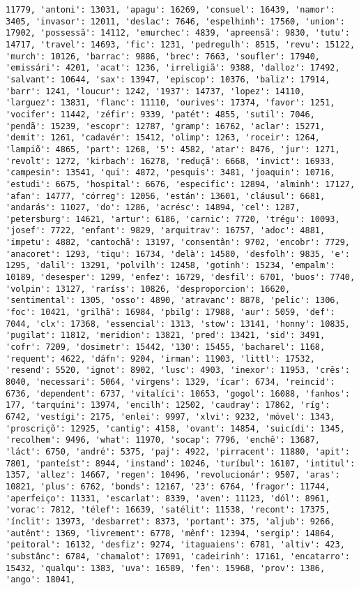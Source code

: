 \begin{Verbatim}[commandchars=\\\{\}]
11779, 'antoni': 13031, 'apagu': 16269, 'consuel': 16439, 'namor': 3405, 'invasor': 12011, 'deslac': 7646, 'espelhinh': 17560, 'union': 17902, 'possessã': 14112, 'emurchec': 4839, 'apreensã': 9830, 'tutu': 14717, 'travel': 14693, 'fic': 1231, 'pedregulh': 8515, 'revu': 15122, 'murch': 10126, 'barrac': 9886, 'brec': 7663, 'soufler': 17940, 'emissári': 4201, 'acat': 1236, 'irreligiã': 9388, 'dalloz': 17492, 'salvant': 10644, 'sax': 13947, 'episcop': 10376, 'baliz': 17914, 'barr': 1241, 'loucur': 1242, '1937': 14737, 'lopez': 14110, 'larguez': 13831, 'flanc': 11110, 'ourives': 17374, 'favor': 1251, 'vocifer': 11442, 'zéfir': 9339, 'patét': 4855, 'sutil': 7046, 'pendã': 15239, 'escopr': 12787, 'gramp': 16762, 'aclar': 15271, 'demit': 1261, 'cadavér': 15412, 'olimp': 1263, 'roceir': 1264, 'lampiõ': 4865, 'part': 1268, '5': 4582, 'atar': 8476, 'jur': 1271, 'revolt': 1272, 'kirbach': 16278, 'reduçã': 6668, 'invict': 16933, 'campesin': 13541, 'qui': 4872, 'pesquis': 3481, 'joaquin': 10716, 'estudi': 6675, 'hospital': 6676, 'especific': 12894, 'alminh': 17127, 'afan': 14777, 'córreg': 12056, 'están': 13601, 'cláusul': 6681, 'andarás': 11027, 'do': 1286, 'acrésc': 14894, 'cel': 1287, 'petersburg': 14621, 'artur': 6186, 'carnic': 7720, 'trégu': 10093, 'josef': 7722, 'enfant': 9829, 'arquitrav': 16757, 'adoc': 4881, 'impetu': 4882, 'cantochã': 13197, 'consentân': 9702, 'encobr': 7729, 'anacoret': 1293, 'tiqu': 16734, 'delà': 14580, 'desfolh': 9835, 'e': 1295, 'dalil': 13291, 'polvilh': 12458, 'gotinh': 15234, 'empalm': 10189, 'desesper': 1299, 'enfez': 16729, 'desfil': 6701, 'buos': 7740, 'volpin': 13127, 'raríss': 10826, 'desproporcion': 16620, 'sentimental': 1305, 'osso': 4890, 'atravanc': 8878, 'pelic': 1306, 'foc': 10421, 'grilhã': 16984, 'pbilg': 17988, 'aur': 5059, 'def': 7044, 'clx': 17368, 'essencial': 1313, 'stow': 13141, 'honny': 10835, 'pugilat': 11812, 'meridion': 13821, 'pred': 13421, 'sid': 3491, 'cofr': 7209, 'dosimetr': 15442, '130': 15455, 'bacharel': 1168, 'requent': 4622, 'dáfn': 9204, 'irman': 11903, 'littl': 17532, 'resend': 5520, 'ignot': 8902, 'lusc': 4903, 'inexor': 11953, 'crês': 8040, 'necessari': 5064, 'virgens': 1329, 'ícar': 6734, 'reincid': 6736, 'dependent': 6737, 'vitalíci': 10653, 'gogol': 16088, 'fanhos': 177, 'tarquíni': 13974, 'encilh': 12502, 'caudray': 17862, 'ríg': 6742, 'vestígi': 2175, 'enlei': 9997, 'xlvi': 9232, 'móvel': 1343, 'proscriçõ': 12925, 'cantig': 4158, 'ovant': 14854, 'suicídi': 1345, 'recolhem': 9496, 'what': 11970, 'socap': 7796, 'enchê': 13687, 'láct': 6750, 'andré': 5375, 'paj': 4922, 'pirracent': 11880, 'apit': 7801, 'panteíst': 8944, 'instand': 10246, 'turíbul': 16107, 'intitul': 1357, 'allez': 14667, 'regen': 10496, 'revolucionár': 9507, 'aras': 10821, 'plus': 6762, 'bonds': 12167, '23': 6764, 'fragor': 11744, 'aperfeiço': 11331, 'escarlat': 8339, 'aven': 11123, 'dól': 8961, 'vorac': 7812, 'télef': 16639, 'satélit': 11538, 'recont': 17375, 'ínclit': 13973, 'desbarret': 8373, 'portant': 375, 'aljub': 9266, 'autênt': 1369, 'livrement': 6778, 'mênf': 12394, 'sergip': 14864, 'peitoral': 16132, 'desfiz': 9274, 'itaguaiens': 6781, 'altiv': 423, 'substânc': 6784, 'chamalot': 17091, 'cadeirinh': 17161, 'encatarro': 15432, 'qualqu': 1383, 'uva': 16589, 'fen': 15968, 'prov': 1386, 'ango': 18041, 
\end{Verbatim}
